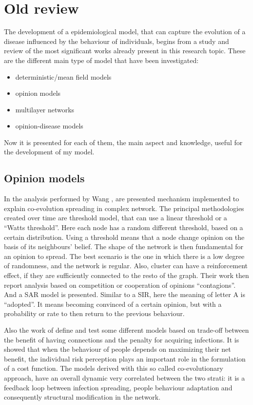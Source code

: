  
\chapter{Old review}

The development of a epidemiological model, that can capture the evolution of a disease influenced by the behaviour of individuals, begins from a study and review of the most significant works already present in this research topic.
These are the different main type of model that have been investigated:
\begin{itemize}
	\item deterministic/mean field models
	\item opinion models
	\item multilayer networks
	\item opinion-disease models	
\end{itemize}

Now it is presented for each of them, the main aspect and knowledge, useful for the development of my model.   

\section{Opinion models}
In the analysis performed by Wang \cite{Wang_2019}, are presented mechanism implemented to explain co-evolution spreading in complex network. The principal methodologies created over time are threshold model, that can use a linear threshold or a “Watts threshold”. Here each node has a random different threshold, based on a certain distribution. Using a threshold means that a node change opinion on the basis of its neighbours’ belief. The shape of the network is then fundamental for an opinion to spread. The best scenario is the one in which there is a low degree of randomness, and the network is regular. Also, cluster can have a reinforcement effect, if they are sufficiently connected to the resto of the graph. Their work then report analysis based on competition or cooperation of opinions “contagions”. And a SAR model is presented. Similar to a SIR, here the meaning of letter A is “adopted”. It means becoming convinced of a certain opinion, but with a probability or rate to then return to the previous behaviour. 

Also the work of \cite{Nunner2021} define and test some different models based on trade-off between the benefit of having connections and the penalty for acquiring infections. It is showed that when the behaviour of people depends on maximizing their net benefit, the individual risk perception plays an important role in the formulation of a cost function. The models derived with this so called co-evolutionary approach, have an overall dynamic very correlated between the two strati: it is a feedback loop between infection spreading, people behaviour adaptation and consequently structural modification in the network.



